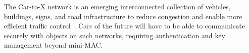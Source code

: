The Car-to-X network is an emerging interconnected collection of vehicles, buildings, signs, and road infrastructure 
to reduce congestion and enable more efficient traffic control~\cite{C2X}. Cars of the future will have to be able to communicate
securely with objects on such networks, requiring authentication and key management beyond mini-MAC.


